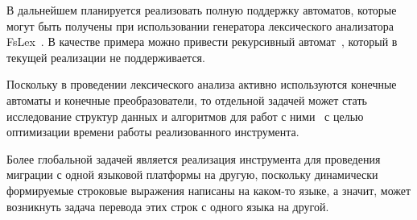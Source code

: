 В дальнейшем планируется реализовать полную поддержку автоматов, которые могут быть получены при использовании генератора лексического анализатора FsLex~\cite{FsLex}. В качестве примера можно привести рекурсивный автомат~\cite{Tellier06learningrecursive}, который в текущей реализации не поддерживается. 

Поскольку в проведении лексического анализа активно используются конечные автоматы и конечные преобразователи, то отдельной задачей может стать исследование структур данных и алгоритмов для работ с ними~\cite{AlgoFSA} с целью оптимизации времени работы реализованного инструмента. 

Более глобальной задачей является реализация инструмента для проведения миграции с одной языковой платформы на другую, поскольку динамически формируемые строковые выражения написаны на каком-то языке, а значит, может возникнуть задача перевода этих строк с одного языка на другой. 

